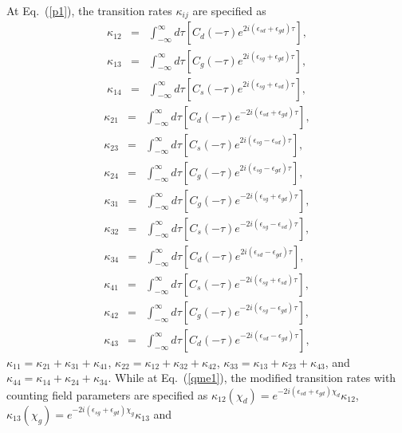 \documentclass[twocolumn,preprintnumbers,amsmath,amssymb]{revtex4}
\begin{document}
At Eq.~(\ref{p1}), the transition rates $\kappa_{ij}$ are specified as
\begin{eqnarray}
\kappa_{12}&=&\int^{\infty}_{-\infty}d{\tau}[C_d(-\tau)e^{2i(\epsilon_{sd}+\epsilon_{gd})\tau}],\nonumber\\
\kappa_{13}&=&\int^{\infty}_{-\infty}d{\tau}[C_g(-\tau)e^{2i(\epsilon_{sg}+\epsilon_{gd})\tau}],\nonumber\\
\kappa_{14}&=&\int^{\infty}_{-\infty}d{\tau}[C_s(-\tau)e^{2i(\epsilon_{sg}+\epsilon_{sd})\tau}],\nonumber
\end{eqnarray}
\begin{eqnarray}
\kappa_{21}&=&\int^{\infty}_{-\infty}d{\tau}[C_d(-\tau)e^{-2i(\epsilon_{sd}+\epsilon_{gd})\tau}],\nonumber\\
\kappa_{23}&=&\int^{\infty}_{-\infty}d{\tau}[C_s(-\tau)e^{2i(\epsilon_{sg}-\epsilon_{sd})\tau}],\nonumber\\
\kappa_{24}&=&\int^{\infty}_{-\infty}d{\tau}[C_g(-\tau)e^{2i(\epsilon_{sg}-\epsilon_{gd})\tau}],\nonumber
\end{eqnarray}
\begin{eqnarray}
\kappa_{31}&=&\int^{\infty}_{-\infty}d{\tau}[C_g(-\tau)e^{-2i(\epsilon_{sg}+\epsilon_{gd})\tau}],\nonumber\\
\kappa_{32}&=&\int^{\infty}_{-\infty}d{\tau}[C_s(-\tau)e^{-2i(\epsilon_{sg}-\epsilon_{sd})\tau}],\nonumber\\
\kappa_{34}&=&\int^{\infty}_{-\infty}d{\tau}[C_d(-\tau)e^{2i(\epsilon_{sd}-\epsilon_{gd})\tau}],\nonumber
\end{eqnarray}
\begin{eqnarray}
\kappa_{41}&=&\int^{\infty}_{-\infty}d{\tau}[C_s(-\tau)e^{-2i(\epsilon_{sg}+\epsilon_{sd})\tau}],\nonumber\\
\kappa_{42}&=&\int^{\infty}_{-\infty}d{\tau}[C_g(-\tau)e^{-2i(\epsilon_{sg}-\epsilon_{gd})\tau}],\nonumber\\
\kappa_{43}&=&\int^{\infty}_{-\infty}d{\tau}[C_d(-\tau)e^{-2i(\epsilon_{sd}-\epsilon_{gd})\tau}],\nonumber
\end{eqnarray}
$\kappa_{11}=\kappa_{21}+\kappa_{31}+\kappa_{41}$,
$\kappa_{22}=\kappa_{12}+\kappa_{32}+\kappa_{42}$,
$\kappa_{33}=\kappa_{13}+\kappa_{23}+\kappa_{43}$,
and
$\kappa_{44}=\kappa_{14}+\kappa_{24}+\kappa_{34}$.
While at Eq.~(\ref{qme1}), the modified transition rates with counting field parameters are specified as
$\kappa_{12}(\chi_d)=e^{-2i(\epsilon_{sd}+\epsilon_{gd})\chi_d}\kappa_{12}$,
$\kappa_{13}(\chi_g)=e^{-2i(\epsilon_{sg}+\epsilon_{gd})\chi_g}\kappa_{13}$ and
\end{document}
